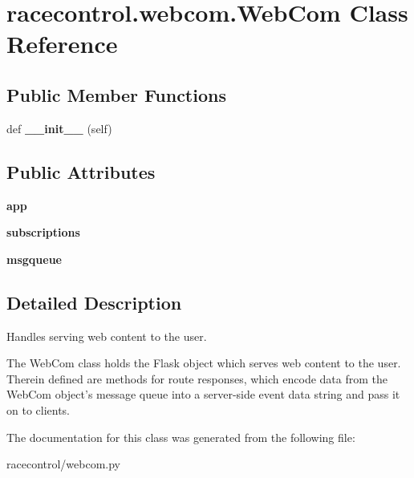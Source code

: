 \section{racecontrol.\+webcom.\+Web\+Com Class Reference}
\label{classracecontrol_1_1webcom_1_1WebCom}
\subsection*{Public Member Functions}
\begin{DoxyCompactItemize}
\item 
def {\bfseries \+\_\+\+\_\+init\+\_\+\+\_\+} (self)\label{classracecontrol_1_1webcom_1_1WebCom_abda1a5f7edd42d594a0fcae068754633}

\end{DoxyCompactItemize}
\subsection*{Public Attributes}
\begin{DoxyCompactItemize}
\item 
{\bfseries app}\label{classracecontrol_1_1webcom_1_1WebCom_a269d39fdc077feed56efffc6d63613b0}

\item 
{\bfseries subscriptions}\label{classracecontrol_1_1webcom_1_1WebCom_ab1a05a76a4c3a5086e780da36660935f}

\item 
{\bfseries msgqueue}\label{classracecontrol_1_1webcom_1_1WebCom_aa4e6188f98d31691123ce550904d73c2}

\end{DoxyCompactItemize}


\subsection{Detailed Description}
\begin{DoxyVerb}Handles serving web content to the user.

The WebCom class holds the Flask object which serves web content to the
user. Therein defined are methods for route responses, which encode data
from the WebCom object's message queue into a server-side event data string
and pass it on to clients.
\end{DoxyVerb}
 

The documentation for this class was generated from the following file\+:\begin{DoxyCompactItemize}
\item 
racecontrol/webcom.\+py\end{DoxyCompactItemize}
